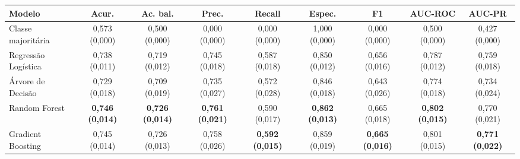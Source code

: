 \begin{tabular}{@{}lcccccccc@{}}
\toprule
Modelo & Acur. & Ac. bal. & Prec. & Recall & Espec. & F1 & AUC-ROC & AUC-PR \\
\midrule
Classe majoritária & 0,573 (0,000) & 0,500 (0,000) & 0,000 (0,000) & 0,000 (0,000) & 1,000 (0,000) & 0,000 (0,000) & 0,500 (0,000) & 0,427 (0,000) \\
Regressão Logística & 0,738 (0,011) & 0,719 (0,012) & 0,745 (0,018) & 0,587 (0,018) & 0,850 (0,012) & 0,656 (0,016) & 0,787 (0,012) & 0,759 (0,018) \\
Árvore de Decisão & 0,729 (0,018) & 0,709 (0,019) & 0,735 (0,027) & 0,572 (0,028) & 0,846 (0,018) & 0,643 (0,026) & 0,774 (0,018) & 0,734 (0,024) \\
Random Forest & \textbf{0,746 (0,014)} & \textbf{0,726 (0,014)} & \textbf{0,761 (0,021)} & 0,590 (0,017) & \textbf{0,862 (0,013)} & 0,665 (0,018) & \textbf{0,802 (0,015)} & 0,770 (0,021) \\
Gradient Boosting & 0,745 (0,014) & 0,726 (0,013) & 0,758 (0,026) & \textbf{0,592 (0,015)} & 0,859 (0,019) & \textbf{0,665 (0,016)} & 0,801 (0,015) & \textbf{0,771 (0,022)} \\
\bottomrule
\end{tabular}
